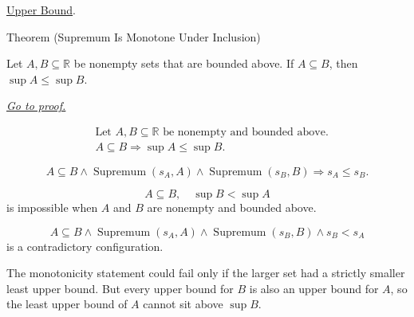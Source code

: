 \begin{dependencies}
\hyperref[def:upper-bound]{Upper Bound}.
\end{dependencies}


\begin{theorembox}{Theorem (Supremum Is Monotone Under Inclusion)}
\begin{theorem}
\label{thm:supremum-is-monotone-under-inclusion}
Let $A,B\subseteq\mathbb{R}$ be nonempty sets that are bounded above. If $A\subseteq B$, then $\sup A\le \sup B$.

\smallskip
\noindent
\hyperref[prf:supremum-is-monotone-under-inclusion]{\textit{Go to proof.}}
\end{theorem}
\end{theorembox}

\begin{remark*}
\[
\begin{aligned}
&\text{Let }A,B\subseteq\mathbb{R}\text{ be nonempty and bounded above.}\\
&A\subseteq B
\Longrightarrow
\sup A\le \sup B.
\end{aligned}
\]
\end{remark*}

\begin{remark*}
\[
A\subseteq B\land \operatorname{Supremum}(s_A,A)\land \operatorname{Supremum}(s_B,B)
\Longrightarrow
s_A\le s_B.
\]
\end{remark*}

\begin{remark*}
\[
A\subseteq B,\quad \sup B<\sup A
\]
is impossible when $A$ and $B$ are nonempty and bounded above.
\end{remark*}

\begin{remark*}
\[
A\subseteq B\land \operatorname{Supremum}(s_A,A)\land \operatorname{Supremum}(s_B,B)\land s_B<s_A
\]
is a contradictory configuration.
\end{remark*}

\begin{remark*}
The monotonicity statement could fail only if the larger set had a strictly smaller least upper bound. But every upper bound for $B$ is also an upper bound for $A$, so the least upper bound of $A$ cannot sit above $\sup B$.
\end{remark*}

